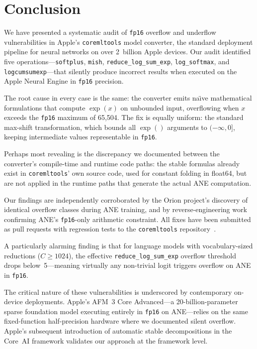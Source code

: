 \documentclass[10pt,twocolumn]{article}
\newcommand{\fp}{\texttt{fp16}}
\newcommand{\ane}{ANE}
\newcommand{\coremltools}{\texttt{coremltools}}
\begin{document}
\section{Conclusion}
\label{sec:conclusion}

We have presented a systematic audit of \fp{} overflow and underflow
vulnerabilities in Apple's \coremltools{} model converter, the standard
deployment pipeline for neural networks on over 2~billion Apple devices.  Our
audit identified five operations---\texttt{softplus}, \texttt{mish},
\texttt{reduce\_log\_sum\_exp}, \texttt{log\_softmax}, and
\texttt{logcumsumexp}---that silently produce incorrect results when executed on
the Apple Neural Engine in \fp{} precision.

The root cause in every case is the same: the converter emits
na\"{\i}ve mathematical formulations that compute $\exp(x)$ on
unbounded input, overflowing when $x$ exceeds the \fp{} maximum of
65{,}504.  The fix is equally uniform: the standard max-shift
transformation, which bounds all $\exp()$ arguments to
$(-\infty, 0]$, keeping intermediate values representable in \fp{}.

Perhaps most revealing is the discrepancy we documented between the converter's
compile-time and runtime code paths: the stable formulas already exist in
\coremltools{}' own source code, used for constant folding in float64, but are
not applied in the runtime paths that generate the actual \ane{} computation.

Our findings are independently corroborated by the Orion project's discovery of
identical overflow classes during \ane{} training, and by reverse-engineering
work confirming \ane{}'s \fp{}-only arithmetic constraint.  All fixes have been
submitted as pull requests with regression tests to the \coremltools{}
repository~\citep{pr2725,pr2726,pr2727}.

A particularly alarming finding is that for language models with
vocabulary-sized reductions ($C \geq 1024$), the effective
\texttt{reduce\_log\_sum\_exp} overflow threshold drops below~5---meaning
virtually any non-trivial logit triggers overflow on \ane{} in \fp{}.

The critical nature of these vulnerabilities is underscored by contemporary
on-device deployments.  Apple's AFM~3 Core Advanced---a 20-billion-parameter
sparse foundation model executing entirely in \fp{} on \ane{}---relies on
the same fixed-function half-precision hardware where we documented silent
overflow.  Apple's subsequent introduction of automatic stable decompositions
in the Core~AI framework validates our approach at the framework level.
\end{document}
